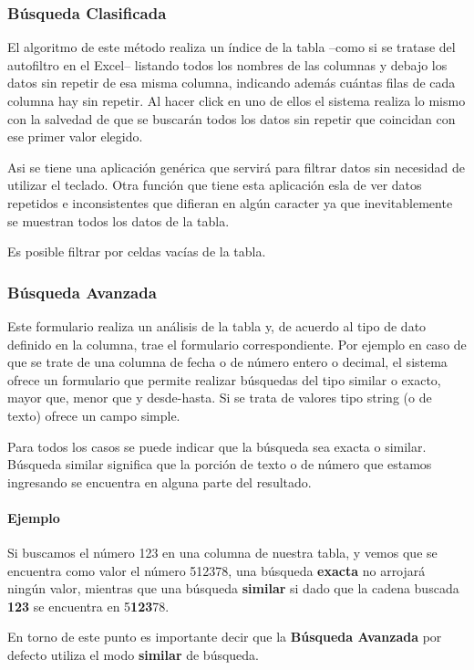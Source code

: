 \documentclass[a4paper,10pt]{article}
\begin{document}
\subsubsection{Búsqueda Clasificada}

El algoritmo de este método realiza un índice de la tabla --como si se tratase del autofiltro en el Excel-- listando todos los nombres de las columnas y debajo los datos sin repetir de esa misma columna, indicando además cuántas filas de cada columna hay sin repetir. Al hacer click en uno de ellos el sistema realiza lo mismo con la salvedad de que se buscarán todos los datos sin repetir que coincidan con ese primer valor elegido.

Asi se tiene una aplicación genérica que servirá para filtrar datos sin necesidad de utilizar el teclado. Otra función que tiene esta aplicación esla de ver datos repetidos e inconsistentes que difieran en algún caracter ya que inevitablemente se muestran todos los datos de la tabla.

Es posible filtrar por celdas vacías de la tabla. 


\subsubsection{Búsqueda Avanzada}

Este formulario realiza un análisis de la tabla y, de acuerdo al tipo de dato definido en la columna, trae el formulario correspondiente. Por ejemplo en caso de que se trate de una columna de fecha o de número entero o decimal, el sistema ofrece un formulario que permite realizar búsquedas del tipo similar o exacto, mayor que, menor que y desde-hasta. Si se trata de valores tipo string (o de texto) ofrece un campo simple.

Para todos los casos se puede indicar que la búsqueda sea exacta o similar. Búsqueda similar significa que la porción de texto o de número que estamos ingresando se encuentra en alguna parte del resultado.

\paragraph{Ejemplo} Si buscamos el número 123 en una columna de nuestra tabla, y vemos que se encuentra como valor el número 512378, una búsqueda \textbf{exacta} no arrojará ningún valor, mientras que una búsqueda \textbf{similar} si dado que la cadena buscada \textbf{123} se encuentra en 5\textbf{123}78.

En torno de este punto es importante decir que la \textbf{Búsqueda Avanzada} por defecto utiliza el modo \textbf{similar} de búsqueda.
\end{document}
